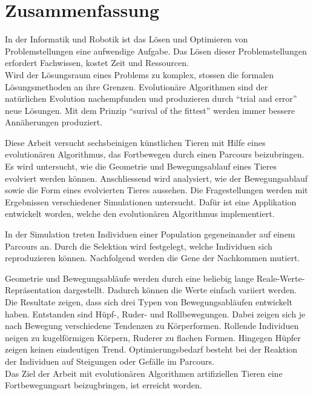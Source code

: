 %
%


\chapter{Zusammenfassung}

  In der Informatik und Robotik ist das Lösen und Optimieren von Problemstellungen eine aufwendige Aufgabe.
  Das Lösen dieser Problemstellungen erfordert Fachwissen, kostet Zeit und Ressourcen.
  \\
  Wird der Lösungsraum eines Problems zu komplex, stossen die formalen Lösungsmethoden an ihre Grenzen.
  Evolutionäre Algorithmen sind der natürlichen Evolution nachempfunden und
  produzieren durch ``trial and error'' neue Lösungen.
  Mit dem Prinzip ``surival of the fittest'' werden immer bessere Annäherungen produziert.

  \smallskip

  Diese Arbeit versucht sechsbeinigen künstlichen Tieren mit Hilfe eines evolutionären Algorithmus,
  das Fortbewegen durch einen Parcours beizubringen.
  Es wird untersucht, wie die Geometrie und Bewegungsablauf eines Tieres evolviert werden können.
  Anschliessend wird analysiert, wie der Bewegungsablauf sowie die Form eines evolvierten Tieres aussehen.
  Die Fragestellungen werden mit Ergebnissen verschiedener Simulationen untersucht.
  Dafür ist eine Applikation entwickelt worden, welche den evolutionären Algorithmus implementiert.

  \smallskip

  In der Simulation treten Individuen einer Population gegeneinander auf einem Parcours an.
  Durch die Selektion wird festgelegt, welche Individuen sich reproduzieren können.
  Nachfolgend werden die Gene der Nachkommen mutiert.

  \smallskip

  Geometrie und Bewegungsabläufe werden durch eine beliebig lange Reale-Werte-Repräsentation dargestellt.
  Dadurch können die Werte einfach variiert werden.
  Die Resultate zeigen, dass sich drei Typen von Bewegungsabläufen entwickelt haben.
  Entstanden sind Hüpf-, Ruder- und Rollbewegungen.
  Dabei zeigen sich je nach Bewegung verschiedene Tendenzen zu Körperformen.
  Rollende Individuen neigen zu kugelförmigen Körpern, Ruderer zu flachen Formen.
  Hingegen Hüpfer zeigen keinen eindeutigen Trend.
  Optimierungsbedarf besteht bei der Reaktion der Individuen auf Steigungen oder Gefälle im Parcours.
  \\
  Das Ziel der Arbeit mit evolutionären Algorithmen artifiziellen Tieren eine Fortbewegungsart beizugbringen,
  ist erreicht worden.
